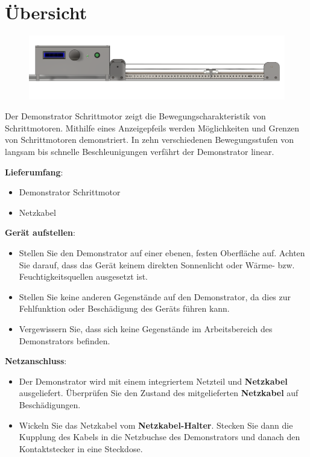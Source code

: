 %
%
%



\chapter{Übersicht}

\begin{figure}[htb]
	\begin{center}
		
			\includegraphics[width=\textwidth]{Images/Konstruktion1.png}
	\end{center}
\end{figure}


Der Demonstrator Schrittmotor zeigt die Bewegungscharakteristik von Schrittmotoren. Mithilfe eines Anzeigepfeils werden Möglichkeiten und Grenzen von Schrittmotoren demonstriert. In zehn verschiedenen Bewegungsstufen von langsam bis schnelle Beschleunigungen verfährt der Demonstrator linear. 

\newpage
\textbf{Lieferumfang}: 
\begin{itemize}
\item Demonstrator Schrittmotor	
\item Netzkabel
	\end{itemize} 	
	\bigskip
	\textbf{Gerät aufstellen}: 
	\begin{itemize}
	\item Stellen Sie den Demonstrator auf einer ebenen, festen Oberfläche auf. Achten Sie darauf, dass das Gerät keinem direkten Sonnenlicht oder Wärme- bzw. Feuchtigkeitsquellen ausgesetzt ist. 
	\item Stellen Sie keine anderen Gegenstände auf den Demonstrator, da dies zur Fehlfunktion oder Beschädigung des Geräts führen kann. 
	\item Vergewissern Sie, dass sich keine Gegenstände im Arbeitsbereich des Demonstrators befinden.
	\end{itemize}
	\textbf{Netzanschluss}:
	\begin{itemize}
		\item Der Demonstrator wird mit einem integriertem Netzteil und \textbf{Netzkabel} ausgeliefert. Überprüfen Sie den Zustand des mitgelieferten \textbf{Netzkabel} auf Beschädigungen.
		\item Wickeln Sie das Netzkabel vom \textbf{Netzkabel-Halter}. Stecken Sie dann die Kupplung des Kabels in die Netzbuchse des Demonstrators und danach den Kontaktstecker in eine Steckdose. 
	\end{itemize} 



